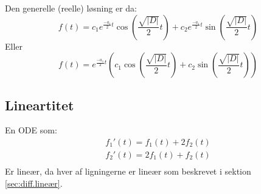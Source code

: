 Den generelle (reelle) løsning er da:
\[
f(t) = c_1 e^{\frac{-a_1}{2} t} \cos\left(\frac{\sqrt{|D|}}{2} t\right) + c_2 e^{\frac{-a_1}{2} t} \sin\left(\frac{\sqrt{|D|}}{2} t\right)
\]
Eller
\[
f(t) = e^{\frac{-a_1}{2} t} \left( c_1 \cos\left(\frac{\sqrt{|D|}}{2} t\right) + c_2 \sin\left(\frac{\sqrt{|D|}}{2} t\right) \right)
\]

\subsection{Lineartitet}

En ODE som:
\[
\begin{split}
    f_1'(t) = f_1(t) + 2 f_2(t) \\
    f_2'(t) = 2 f_1(t) + f_2(t) \\
\end{split}
\]
Er lineær, da hver af ligningerne er lineær som beskrevet i sektion \ref{sec:diff.lineær}.